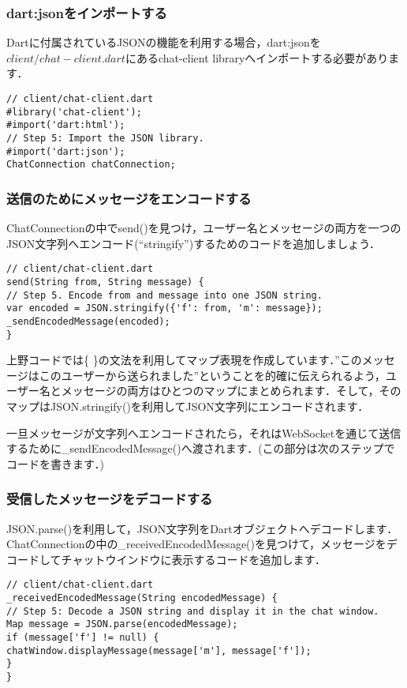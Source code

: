 \subsubsection{dart:jsonをインポートする}

Dartに付属されているJSONの機能を利用する場合，dart:jsonを$ client/chat-client.dart $にあるchat-client libraryへインポートする必要があります．

\begin{verbatim}
// client/chat-client.dart
#library('chat-client');
#import('dart:html');
// Step 5: Import the JSON library.
#import('dart:json');
ChatConnection chatConnection;
\end{verbatim}

\subsubsection{送信のためにメッセージをエンコードする}

ChatConnectionの中でsend()を見つけ，ユーザー名とメッセージの両方を一つのJSON文字列へエンコード(``stringify'')するためのコードを追加しましょう．

\begin{verbatim}
// client/chat-client.dart
send(String from, String message) {
// Step 5. Encode from and message into one JSON string.
var encoded = JSON.stringify({'f': from, 'm': message});
_sendEncodedMessage(encoded);
}
\end{verbatim}

上野コードでは\{ \}の文法を利用してマップ表現を作成しています．''このメッセージはこのユーザーから送られました''ということを的確に伝えられるよう，ユーザー名とメッセージの両方はひとつのマップにまとめられます．そして，そのマップはJSON.stringify()を利用してJSON文字列にエンコードされます．

一旦メッセージが文字列へエンコードされたら，それはWebSocketを通じて送信するために\_sendEncodedMessage()へ渡されます．(この部分は次のステップでコードを書きます．)

\subsubsection{受信したメッセージをデコードする}

JSON.parse()を利用して，JSON文字列をDartオブジェクトへデコードします．ChatConnectionの中の\_receivedEncodedMessage()を見つけて，メッセージをデコードしてチャットウインドウに表示するコードを追加します．

\begin{verbatim}
// client/chat-client.dart
_receivedEncodedMessage(String encodedMessage) {
// Step 5: Decode a JSON string and display it in the chat window.
Map message = JSON.parse(encodedMessage);
if (message['f'] != null) {
chatWindow.displayMessage(message['m'], message['f']);
}
}
\end{verbatim}

